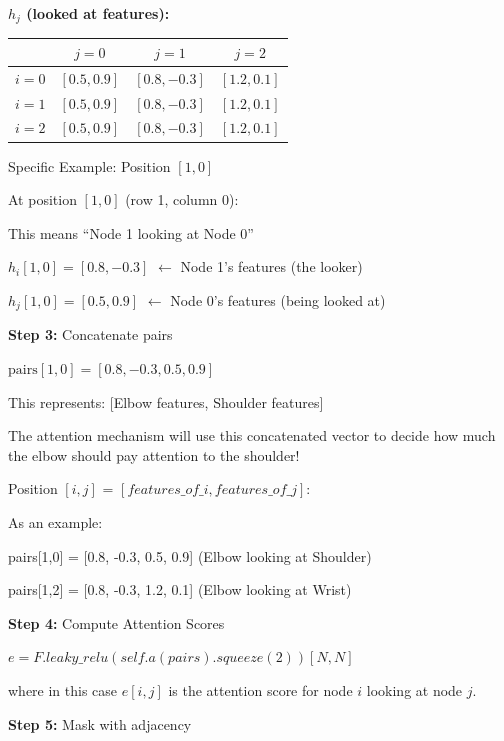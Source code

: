 \begin{center}
\textbf{$h_j$ (looked at features):}
\begin{tabular}{c|c|c|c}
 & $j=0$ & $j=1$ & $j=2$ \\
\hline
$i=0$ & $[0.5,0.9]$ & $[0.8,-0.3]$ & $[1.2,0.1]$ \\
$i=1$ & $[0.5,0.9]$ & $[0.8,-0.3]$ & $[1.2,0.1]$ \\
$i=2$ & $[0.5,0.9]$ & $[0.8,-0.3]$ & $[1.2,0.1]$ \\
\end{tabular}
\end{center}

Specific Example: Position $[1,0]$

At position $[1,0]$ (row 1, column 0):
\begin{compactitem}
    \item This means ``Node 1 looking at Node 0''
    \item $h_i[1,0] = [0.8, -0.3]$ $\leftarrow$ Node 1's features (the looker)
    \item $h_j[1,0] = [0.5, 0.9]$ $\leftarrow$ Node 0's features (being looked at)
\end{compactitem}

\textbf{Step 3:} Concatenate pairs

\begin{compactitem}
    \item $\text{pairs}[1,0] = [0.8, -0.3, 0.5, 0.9]$
    \item This represents: [Elbow features, Shoulder features]
\end{compactitem}

The attention mechanism will use this concatenated vector to decide how much
the elbow should pay attention to the shoulder!

Position $[i,j]$ = $[features\_of\_i, features\_of\_j]$:

As an example:

pairs[1,0] = [0.8, -0.3, 0.5, 0.9]  (Elbow looking at Shoulder)

pairs[1,2] = [0.8, -0.3, 1.2, 0.1]  (Elbow looking at Wrist)

\textbf{Step 4:} Compute Attention Scores 

$e = F.leaky\_relu(self.a(pairs).squeeze(2))  [N, N]$

where in this case $e[i,j]$ is the attention score for node $i$ looking at node $j$.

\textbf{Step 5:} Mask with adjacency

